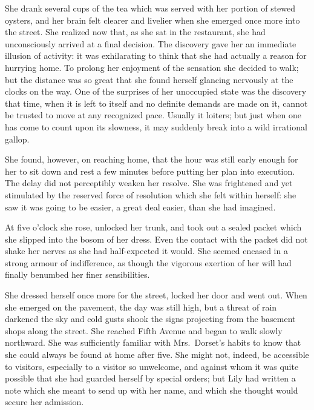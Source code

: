 \documentclass[12pt,a4paper]{book}
\begin{document}
She drank several cups of the tea which was served with her
portion of stewed oysters, and her brain felt clearer and
livelier when she emerged once more into the street. She realized
now that, as she sat in the restaurant, she had unconsciously
arrived at a final decision. The discovery gave her an immediate
illusion of activity: it was exhilarating to think that she had
actually a reason for hurrying home. To prolong her enjoyment of
the sensation she decided to walk; but the distance was so great
that she found herself glancing nervously at the clocks on the
way. One of the surprises of her unoccupied state was the
discovery that time, when it is left to itself and no definite
demands are made on it, cannot be trusted to move at any
recognized pace. Usually it loiters; but just when one has come
to count upon its slowness, it may suddenly break into a wild
irrational gallop.





She found, however, on reaching home, that the hour was still
early enough for her to sit down and rest a few minutes before
putting her plan into execution. The delay did not perceptibly
weaken her resolve. She was frightened and yet stimulated by the
reserved force of resolution which she felt within herself: she
saw it was going to be easier, a great deal easier, than she had
imagined.





At five o'clock she rose, unlocked her trunk, and took out a
sealed packet which she slipped into the bosom of her dress. Even
the contact with the packet did not shake her nerves as she had
half-expected it would. She seemed encased in a strong armour of
indifference, as though the vigorous exertion of her will had
finally benumbed her finer sensibilities.





She dressed herself once more for the street, locked her door and
went out. When she emerged on the pavement, the day was still
high, but a threat of rain darkened the sky and cold
gusts shook the signs projecting from the basement shops along
the street. She reached Fifth Avenue and began to walk slowly
northward. She was sufficiently familiar with Mrs.\ Dorset's
habits to know that she could always be found at home after five. 
She might not, indeed, be accessible to visitors, especially to a
visitor so unwelcome, and against whom it was quite possible that
she had guarded herself by special orders; but Lily had written a
note which she meant to send up with her name, and which she
thought would secure her admission.
\end{document}
